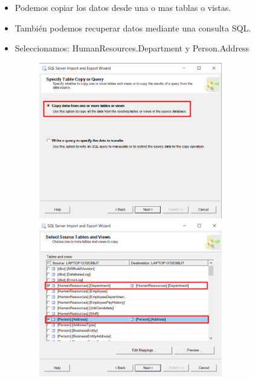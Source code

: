 \documentclass[12pt,letterpaper]{article}
\begin{document}
\begin{itemize}
\item Podemos copiar los datos desde una o mas tablas o vistas. 
\item También podemos recuperar datos mediante una consulta SQL.
\item Seleccionamos: HumanResources.Department y Person.Address
	\begin{figure}[htb]
		\begin{center}
			\includegraphics[width=8cm]{./IMAGENES/Tarea1_5}
			\includegraphics[width=8cm]{./IMAGENES/Tarea1_6}
		\end{center}
	\end{figure}

\newpage


\end{itemize}
\end{document}
